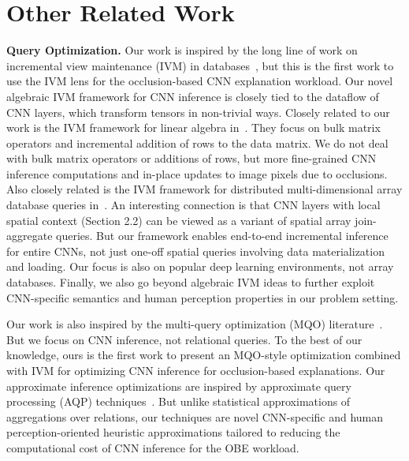 \documentclass[10pt, sigconf]{acmart}
\begin{document}
\section{Other Related Work}

\vspace{2mm}
\noindent \textbf{Query Optimization.}
Our work is inspired by the long line of work on incremental view maintenance (IVM) in databases~\cite{chirkova2012materialized, gupta1995maintenance, levy1995answering}, but this is the first work to use the IVM lens for the occlusion-based CNN explanation workload. Our novel algebraic IVM framework for CNN inference is closely tied to the dataflow of CNN layers, which transform tensors in non-trivial ways. Closely related to our work is the IVM framework for linear algebra in~\cite{nikolic2014linview}. They focus on bulk matrix operators and incremental addition of rows to the data matrix. We do not deal with bulk matrix operators or additions of rows, but more fine-grained CNN inference computations and in-place updates to image pixels due to occlusions. Also closely related is the IVM framework for distributed multi-dimensional array database queries in~\cite{zhao2017incremental}. An interesting connection is that CNN layers with local spatial context (Section 2.2) can be viewed as a variant of spatial array join-aggregate queries. But our framework enables end-to-end incremental inference for entire CNNs, not just one-off spatial queries involving data materialization and loading. Our focus is also on popular deep learning environments, not array databases. Finally, we also go beyond algebraic IVM ideas to further exploit CNN-specific semantics and human perception properties in our problem setting.

Our work is also inspired by the multi-query optimization (MQO) literature~\cite{sellis1988multiple,le2012scalable}. But we focus on CNN inference, not relational queries. To the best of our knowledge, ours is the first work to present an MQO-style optimization combined with IVM for optimizing CNN inference for occlusion-based explanations.
Our approximate inference optimizations are inspired by approximate query processing (AQP) techniques~\cite{park2018verdictdb,garofalakis2001approximate}. But unlike statistical approximations of aggregations over relations, our techniques are novel CNN-specific and human perception-oriented heuristic approximations tailored to reducing the computational cost of CNN inference for the OBE workload.
\end{document}
